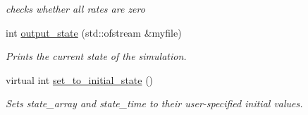 \begin{DoxyCompactItemize}
\begin{DoxyCompactList}\small\item\em checks whether all rates are zero \end{DoxyCompactList}\item 
int \hyperlink{class_realization_ab7ef90279eef4bf11261084f541c7bb0}{output\+\_\+state} (std\+::ofstream \&myfile)
\begin{DoxyCompactList}\small\item\em Prints the current state of the simulation. \end{DoxyCompactList}\item 
virtual int \hyperlink{class_realization_a391a89af7574a9053f53f8a299c2cc70}{set\+\_\+to\+\_\+initial\+\_\+state} ()
\begin{DoxyCompactList}\small\item\em Sets state\+\_\+array and state\+\_\+time to their user-\/specified initial values. \end{DoxyCompactList}\end{DoxyCompactItemize}
